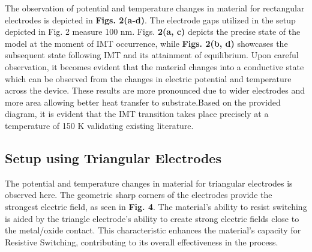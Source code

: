 \documentclass[conference]{IEEEtran}
\begin{document}
The observation of potential and temperature changes in material for rectangular electrodes is depicted in \textbf{Figs. 2(a-d)}. The electrode gaps utilized in the setup depicted in Fig. 2 measure 100 nm. Figs.  \textbf{2(a, c)} depicts the precise state of the model at the moment of IMT occurrence, while \textbf{Figs. 2(b, d)} showcases the subsequent state following IMT and its attainment of equilibrium. Upon careful observation, it becomes evident that the material changes into a conductive state which can be observed from the changes in electric potential and temperature across the device. These results are more pronounced due to wider electrodes and more area allowing better heat transfer to substrate.Based on the provided diagram, it is evident that the IMT transition takes place precisely at a temperature of 150 K validating existing literature.


\subsection{Setup using Triangular Electrodes}

The potential and temperature changes in material for triangular electrodes is observed here. The geometric sharp corners of the electrodes provide the strongest electric field, as seen in \textbf{ Fig. 4}. The material's ability to resist switching is aided by the triangle electrode's ability to create strong electric fields close to the metal/oxide contact.
This characteristic enhances the material's capacity for Resistive Switching, contributing to its overall effectiveness in the process.

\end{document}
